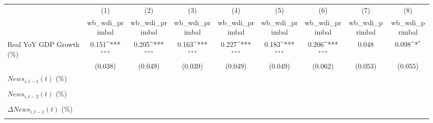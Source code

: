 {
\def\sym#1{\ifmmode^{#1}\else\(^{#1}\)\fi}
\begin{tabular}{l*{8}{c}}
\toprule
                    &\multicolumn{1}{c}{(1)}&\multicolumn{1}{c}{(2)}&\multicolumn{1}{c}{(3)}&\multicolumn{1}{c}{(4)}&\multicolumn{1}{c}{(5)}&\multicolumn{1}{c}{(6)}&\multicolumn{1}{c}{(7)}&\multicolumn{1}{c}{(8)}\\
                    &\multicolumn{1}{c}{wb_wdi_primbal}&\multicolumn{1}{c}{wb_wdi_primbal}&\multicolumn{1}{c}{wb_wdi_primbal}&\multicolumn{1}{c}{wb_wdi_primbal}&\multicolumn{1}{c}{wb_wdi_primbal}&\multicolumn{1}{c}{wb_wdi_primbal}&\multicolumn{1}{c}{wb_wdi_primbal}&\multicolumn{1}{c}{wb_wdi_primbal}\\
\midrule
Real YoY GDP Growth (\%)&       0.151\sym{***}&       0.205\sym{***}&       0.163\sym{***}&       0.227\sym{***}&       0.183\sym{***}&       0.206\sym{***}&       0.048         &       0.098\sym{*}  \\
                    &     (0.038)         &     (0.049)         &     (0.039)         &     (0.049)         &     (0.049)         &     (0.062)         &     (0.053)         &     (0.055)         \\
\addlinespace
$ News_{i,t-1}(t)$ (\%)&                     &                     &                     &                     &                     &                     &                     &                     \\
                    &                     &                     &                     &                     &                     &                     &                     &                     \\
\addlinespace
$ News_{i,t-2}(t)$ (\%)&                     &                     &                     &                     &                     &                     &                     &                     \\
                    &                     &                     &                     &                     &                     &                     &                     &                     \\
\addlinespace
$ \Delta News_{i,t-1}(t)$ (\%)&                     &                     &                     &                     &                     &                     &                     &                     \\
                    &                     &                     &                     &                     &                     &                     &                     &                     \\

\end{tabular}}
